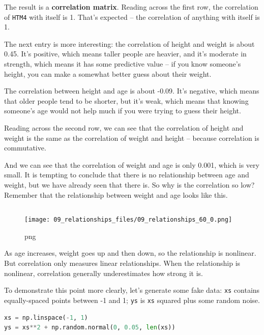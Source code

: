 \documentclass[
]{book}
\newcommand{\passthrough}[1]{#1}
\begin{document}
The result is a \textbf{correlation matrix}. Reading across the first
row, the correlation of \passthrough{\lstinline!HTM4!} with itself is 1.
That's expected -- the correlation of anything with itself is 1.

The next entry is more interesting: the correlation of height and weight
is about 0.45. It's positive, which means taller people are heavier, and
it's moderate in strength, which means it has some predictive value --
if you know someone's height, you can make a somewhat better guess about
their weight.

The correlation between height and age is about -0.09. It's negative,
which means that older people tend to be shorter, but it's weak, which
means that knowing someone's age would not help much if you were trying
to guess their height.

Reading across the second row, we can see that the correlation of height
and weight is the same as the correlation of weight and height --
because correlation is commutative.

And we can see that the correlation of weight and age is only 0.001,
which is very small. It is tempting to conclude that there is no
relationship between age and weight, but we have already seen that there
is. So why is the correlation so low? Remember that the relationship
between weight and age looks like this.

\begin{lstlisting}[language=Python]
\end{lstlisting}

\begin{figure}
\centering
\texttt{[image: 09\_relationships\_files/09\_relationships\_60\_0.png]}
\caption{png}
\end{figure}

As age increases, weight goes up and then down, so the relationship is
nonlinear. But correlation only measures linear relationships. When the
relationship is nonlinear, correlation generally underestimates how
strong it is.

To demonstrate this point more clearly, let's generate some fake data:
\passthrough{\lstinline!xs!} contains equally-spaced points between -1
and 1; \passthrough{\lstinline!ys!} is \passthrough{\lstinline!xs!}
squared plus some random noise.

\begin{lstlisting}[language=Python]
xs = np.linspace(-1, 1)
ys = xs**2 + np.random.normal(0, 0.05, len(xs))
\end{lstlisting}
\end{document}
